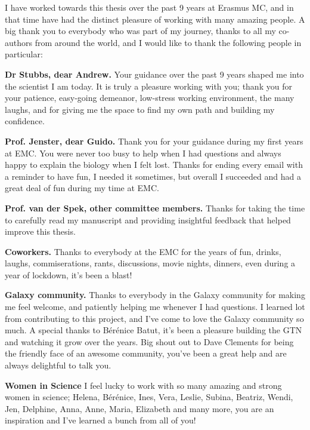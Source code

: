
 I have worked towards this thesis over the past 9 years at Erasmus MC, and in that time have had the distinct pleasure of working with many amazing people. A big thank you to everybody who was part of my journey, thanks to all my co-authors from around the world, and I would like to thank the following people in particular:

\textbf{Dr Stubbs, dear Andrew.} Your guidance over the past 9 years shaped me into the scientist I am today. It is truly a pleasure working with you; thank you for your patience, easy-going demeanor, low-stress working environment, the many laughs, and for giving me the space to find my own path and building my confidence.

\textbf{Prof. Jenster, dear Guido.} Thank you for your guidance during my first years at EMC. You were never too busy to help when I had questions and always happy to explain the biology when I felt lost. Thanks for ending every email with a reminder to have fun, I needed it sometimes, but overall I succeeded and had a great deal of fun during my time at EMC.


\textbf{Prof. van der Spek, other committee members.} Thanks for taking the time to carefully read my manuscript and providing insightful feedback that helped improve this thesis.

\textbf{Coworkers.} Thanks to everybody at the EMC for the years of fun, drinks, laughs, commiserations, rants, discussions, movie nights, dinners, even during a year of lockdown, it's been a blast!

\textbf{Galaxy community.} Thanks to everybody in the Galaxy community for making me feel welcome, and patiently helping me whenever I had questions. I learned lot from contributing to this project, and I've come to love the Galaxy community so much. A special thanks to Bérénice Batut, it's been a pleasure building the GTN and watching it grow over the years. Big shout out to Dave Clements for being the friendly face of an awesome community, you've been a great help and are always delightful to talk you.

\textbf{Women in Science} I feel lucky to work with so many amazing and strong women in science; Helena, Bérénice, Ines, Vera, Leslie, Subina, Beatriz, Wendi, Jen, Delphine, Anna, Anne, Maria, Elizabeth and many more, you are an inspiration and I've learned a bunch from all of you!

